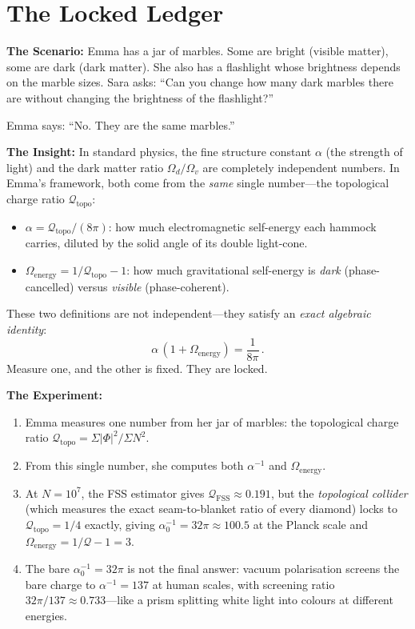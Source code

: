 \documentclass[11pt, a4paper, openany]{book}
\begin{document}
\section{The Locked Ledger}
\begin{thoughtexp}
\textbf{The Scenario:} Emma has a jar of marbles. Some are bright (visible matter), some are dark (dark matter). She also has a flashlight whose brightness depends on the marble sizes. Sara asks: ``Can you change how many dark marbles there are without changing the brightness of the flashlight?''

Emma says: ``No. They are the same marbles.''

\textbf{The Insight:} In standard physics, the fine structure constant $\alpha$ (the strength of light) and the dark matter ratio $\Omega_d/\Omega_v$ are completely independent numbers. In Emma's framework, both come from the \emph{same} single number---the topological charge ratio $\mathcal{Q}_{\mathrm{topo}}$:
\begin{itemize}
  \item $\alpha = \mathcal{Q}_{\mathrm{topo}} / (8\pi)$: how much electromagnetic self-energy each hammock carries, diluted by the solid angle of its double light-cone.
  \item $\Omega_{\mathrm{energy}} = 1/\mathcal{Q}_{\mathrm{topo}} - 1$: how much gravitational self-energy is \emph{dark} (phase-cancelled) versus \emph{visible} (phase-coherent).
\end{itemize}

These two definitions are not independent---they satisfy an \emph{exact algebraic identity}:
\[
  \alpha\,(1 + \Omega_{\mathrm{energy}}) = \frac{1}{8\pi}\,.
\]
Measure one, and the other is fixed. They are locked.

\textbf{The Experiment:}
\begin{enumerate}
  \item Emma measures one number from her jar of marbles: the topological charge ratio $\mathcal{Q}_{\mathrm{topo}} = \Sigma|\Phi|^2 / \Sigma N^2$.
  \item From this single number, she computes both $\alpha^{-1}$ and $\Omega_{\mathrm{energy}}$.
  \item At $N = 10^7$, the FSS estimator gives $\mathcal{Q}_{\mathrm{FSS}} \approx 0.191$, but the \emph{topological collider} (which measures the exact seam-to-blanket ratio of every diamond) locks to $\mathcal{Q}_{\mathrm{topo}} = 1/4$ exactly, giving $\alpha_0^{-1} = 32\pi \approx 100.5$ at the Planck scale and $\Omega_{\mathrm{energy}} = 1/\mathcal{Q} - 1 = 3$.
  \item The bare $\alpha_0^{-1} = 32\pi$ is not the final answer: vacuum polarisation screens the bare charge to $\alpha^{-1} = 137$ at human scales, with screening ratio $32\pi/137 \approx 0.733$---like a prism splitting white light into colours at different energies.
\end{enumerate}


\end{thoughtexp}
\end{document}
